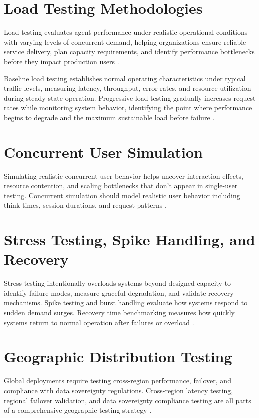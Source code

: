 


\begin{TNtwocol}
\section{Load Testing Methodologies}
Load testing evaluates agent performance under realistic operational conditions with varying levels of concurrent demand, helping organizations ensure reliable service delivery, plan capacity requirements, and identify performance bottlenecks before they impact production users \cite{menasce2002,shahrad2020,getmaximai2024}.

Baseline load testing establishes normal operating characteristics under typical traffic levels, measuring latency, throughput, error rates, and resource utilization during steady-state operation. Progressive load testing gradually increases request rates while monitoring system behavior, identifying the point where performance begins to degrade and the maximum sustainable load before failure \cite{menasce2002,shahrad2020}.

\section{Concurrent User Simulation}
Simulating realistic concurrent user behavior helps uncover interaction effects, resource contention, and scaling bottlenecks that don't appear in single-user testing. Concurrent simulation should model realistic user behavior including think times, session durations, and request patterns \cite{shahrad2020,getmaximai2024}.

\section{Stress Testing, Spike Handling, and Recovery}
Stress testing intentionally overloads systems beyond designed capacity to identify failure modes, measure graceful degradation, and validate recovery mechanisms. Spike testing and burst handling evaluate how systems respond to sudden demand surges. Recovery time benchmarking measures how quickly systems return to normal operation after failures or overload \cite{shahrad2020,menasce2002}.

\section{Geographic Distribution Testing}
Global deployments require testing cross-region performance, failover, and compliance with data sovereignty regulations. Cross-region latency testing, regional failover validation, and data sovereignty compliance testing are all parts of a comprehensive geographic testing strategy \cite{vulimiri2015,getmaximai2024}.
\end{TNtwocol}

